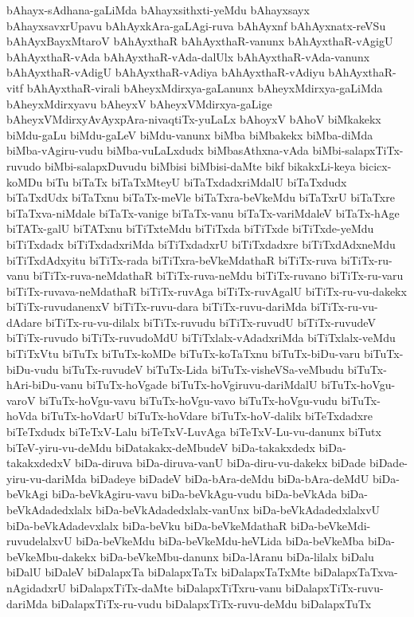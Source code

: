 {bAhayx-sAdhana-gaLiMda
bAhayxsithxti-yeMdu
bAhayxsayx
bAhayxsavxrUpavu
bAhAyxkAra-gaLAgi-ruva
bAhAyxnf
bAhAyxnatx-reVSu
bAhAyxBayxMtaroV
bAhAyxthaR
bAhAyxthaR-vanunx
bAhAyxthaR-vAgigU
bAhAyxthaR-vAda
bAhAyxthaR-vAda-dalUlx
bAhAyxthaR-vAda-vanunx
bAhAyxthaR-vAdigU
bAhAyxthaR-vAdiya
bAhAyxthaR-vAdiyu
bAhAyxthaR-vitf
bAhAyxthaR-virali
bAheyxMdirxya-gaLanunx
bAheyxMdirxya-gaLiMda
bAheyxMdirxyavu
bAheyxV
bAheyxVMdirxya-gaLige
bAheyxVMdirxyAvAyxpAra-nivaqtiTx-yuLaLx
bAhoyxV
bAhoV
biMkakekx
biMdu-gaLu
biMdu-gaLeV
biMdu-vanunx
biMba
biMbakekx
biMba-diMda
biMba-vAgiru-vudu
biMba-vuLaLxdudx
biMbasAthxna-vAda
biMbi-salapxTiTx-ruvudo
biMbi-salapxDuvudu
biMbisi
biMbisi-daMte
bikf
bikakxLi-keya
bicicx-koMDu
biTu
biTaTx
biTaTxMteyU
biTaTxdadxriMdalU
biTaTxdudx
biTaTxdUdx
biTaTxnu
biTaTx-meVle
biTaTxra-beVkeMdu
biTaTxrU
biTaTxre
biTaTxva-niMdale
biTaTx-vanige
biTaTx-vanu
biTaTx-variMdaleV
biTaTx-hAge
biTATx-galU
biTATxnu
biTiTxteMdu
biTiTxda
biTiTxde
biTiTxde-yeMdu
biTiTxdadx
biTiTxdadxriMda
biTiTxdadxrU
biTiTxdadxre
biTiTxdAdxneMdu
biTiTxdAdxyitu
biTiTx-rada
biTiTxra-beVkeMdathaR
biTiTx-ruva
biTiTx-ru-vanu
biTiTx-ruva-neMdathaR
biTiTx-ruva-neMdu
biTiTx-ruvano
biTiTx-ru-varu
biTiTx-ruvava-neMdathaR
biTiTx-ruvAga
biTiTx-ruvAgalU
biTiTx-ru-vu-dakekx
biTiTx-ruvudanenxV
biTiTx-ruvu-dara
biTiTx-ruvu-dariMda
biTiTx-ru-vu-dAdare
biTiTx-ru-vu-dilalx
biTiTx-ruvudu
biTiTx-ruvudU
biTiTx-ruvudeV
biTiTx-ruvudo
biTiTx-ruvudoMdU
biTiTxlalx-vAdadxriMda
biTiTxlalx-veMdu
biTiTxVtu
biTuTx
biTuTx-koMDe
biTuTx-koTaTxnu
biTuTx-biDu-varu
biTuTx-biDu-vudu
biTuTx-ruvudeV
biTuTx-Lida
biTuTx-visheVSa-veMbudu
biTuTx-hAri-biDu-vanu
biTuTx-hoVgade
biTuTx-hoVgiruvu-dariMdalU
biTuTx-hoVgu-varoV
biTuTx-hoVgu-vavu
biTuTx-hoVgu-vavo
biTuTx-hoVgu-vudu
biTuTx-hoVda
biTuTx-hoVdarU
biTuTx-hoVdare
biTuTx-hoV-dalilx
biTeTxdadxre
biTeTxdudx
biTeTxV-Lalu
biTeTxV-LuvAga
biTeTxV-Lu-vu-danunx
biTutx
biTeV-yiru-vu-deMdu
biDatakakx-deMbudeV
biDa-takakxdedx
biDa-takakxdedxV
biDa-diruva
biDa-diruva-vanU
biDa-diru-vu-dakekx
biDade
biDade-yiru-vu-dariMda
biDadeye
biDadeV
biDa-bAra-deMdu
biDa-bAra-deMdU
biDa-beVkAgi
biDa-beVkAgiru-vavu
biDa-beVkAgu-vudu
biDa-beVkAda
biDa-beVkAdadedxlalx
biDa-beVkAdadedxlalx-vanUnx
biDa-beVkAdadedxlalxvU
biDa-beVkAdadevxlalx
biDa-beVku
biDa-beVkeMdathaR
biDa-beVkeMdi-ruvudelalxvU
biDa-beVkeMdu
biDa-beVkeMdu-heVLida
biDa-beVkeMba
biDa-beVkeMbu-dakekx
biDa-beVkeMbu-danunx
biDa-lAranu
biDa-lilalx
biDalu
biDalU
biDaleV
biDalapxTa
biDalapxTaTx
biDalapxTaTxMte
biDalapxTaTxva-nAgidadxrU
biDalapxTiTx-daMte
biDalapxTiTxru-vanu
biDalapxTiTx-ruvu-dariMda
biDalapxTiTx-ru-vudu
biDalapxTiTx-ruvu-deMdu
biDalapxTuTx
}
